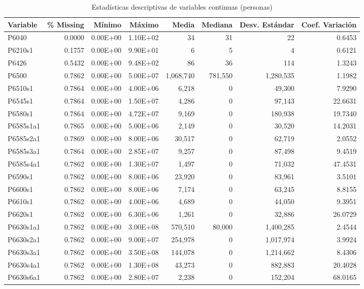 \begin{table}[H]
\centering
\caption{Estadísticas descriptivas de variables continuas (personas)}
\label{tab:01_descriptiva_personas_continua}
\begin{tabular}{lrrrrrrr}
\toprule
Variable & \% Missing & Mínimo & Máximo & Media & Mediana & Desv. Estándar & Coef. Variación \\
\midrule
P6040 & 0.0000 & 0.00E+00 & 1.10E+02 & 34 & 31 & 22 & 0.6453 \\
P6210s1 & 0.1757 & 0.00E+00 & 9.90E+01 & 6 & 5 & 4 & 0.6121 \\
P6426 & 0.5432 & 0.00E+00 & 9.48E+02 & 86 & 36 & 114 & 1.3243 \\
P6500 & 0.7862 & 0.00E+00 & 5.00E+07 & 1,068,740 & 781,550 & 1,280,535 & 1.1982 \\
P6510s1 & 0.7864 & 0.00E+00 & 4.00E+06 & 6,218 & 0 & 49,300 & 7.9290 \\
P6545s1 & 0.7864 & 0.00E+00 & 1.50E+07 & 4,286 & 0 & 97,143 & 22.6631 \\
P6580s1 & 0.7864 & 0.00E+00 & 4.72E+07 & 9,169 & 0 & 180,938 & 19.7340 \\
P6585s1a1 & 0.7865 & 0.00E+00 & 5.00E+06 & 2,149 & 0 & 30,520 & 14.2031 \\
P6585s2a1 & 0.7869 & 0.00E+00 & 8.00E+06 & 30,517 & 0 & 62,719 & 2.0552 \\
P6585s3a1 & 0.7864 & 0.00E+00 & 2.85E+07 & 9,257 & 0 & 87,498 & 9.4519 \\
P6585s4a1 & 0.7862 & 0.00E+00 & 1.30E+07 & 1,497 & 0 & 71,032 & 47.4531 \\
P6590s1 & 0.7862 & 0.00E+00 & 8.00E+06 & 23,920 & 0 & 83,961 & 3.5101 \\
P6600s1 & 0.7862 & 0.00E+00 & 8.00E+06 & 7,174 & 0 & 63,245 & 8.8155 \\
P6610s1 & 0.7862 & 0.00E+00 & 4.00E+06 & 4,689 & 0 & 44,050 & 9.3951 \\
P6620s1 & 0.7862 & 0.00E+00 & 6.30E+06 & 1,261 & 0 & 32,886 & 26.0729 \\
P6630s1a1 & 0.7862 & 0.00E+00 & 3.00E+08 & 570,510 & 80,000 & 1,400,285 & 2.4544 \\
P6630s2a1 & 0.7862 & 0.00E+00 & 9.00E+07 & 254,978 & 0 & 1,017,974 & 3.9924 \\
P6630s3a1 & 0.7862 & 0.00E+00 & 3.50E+08 & 144,078 & 0 & 1,214,662 & 8.4306 \\
P6630s4a1 & 0.7862 & 0.00E+00 & 1.30E+08 & 43,273 & 0 & 882,883 & 20.4028 \\
P6630s6a1 & 0.7862 & 0.00E+00 & 2.80E+07 & 2,238 & 0 & 152,204 & 68.0165 \\

\end{tabular}
\end{table}
